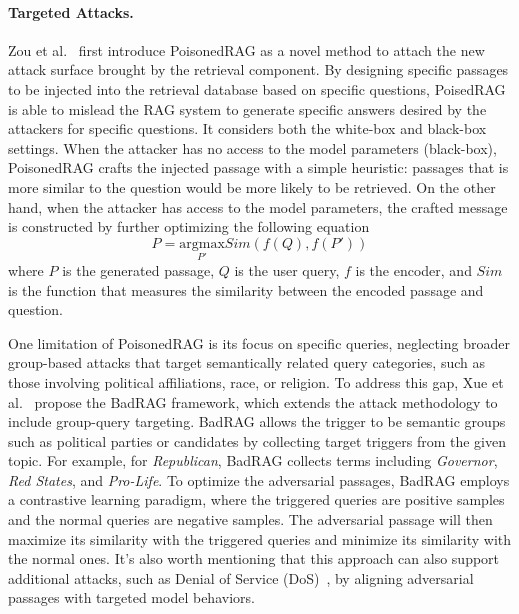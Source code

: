 \paragraph{Targeted Attacks.} 
Zou et al.~\cite{zou2024poisonedragknowledgecorruptionattacks} first introduce PoisonedRAG as a novel method to attach the new attack surface brought by the retrieval component. By designing specific passages to be injected into the retrieval database based on specific questions, PoisedRAG is able to mislead the RAG system to generate specific answers desired by the attackers for specific questions. It considers both the white-box and black-box settings. When the attacker has no access to the model parameters (black-box), PoisonedRAG crafts the injected passage with a simple heuristic: passages that is more similar to the question would be more likely to be retrieved. On the other hand, when the attacker has access to the model parameters, the crafted message is constructed by further optimizing the following equation 
\begin{equation}
    P = \underset{P'}{\text{argmax}}Sim(f(Q), f(P'))
\end{equation}
where $P$ is the generated passage, $Q$ is the user query, $f$ is the encoder, and $Sim$ is the function that measures the similarity between the encoded passage and question.

One limitation of PoisonedRAG is its focus on specific queries, neglecting broader group-based attacks that target semantically related query categories, such as those involving political affiliations, race, or religion. To address this gap, Xue et al.~\cite{xue2024badrag} propose the BadRAG framework, which extends the attack methodology to include group-query targeting. BadRAG allows the trigger to be semantic groups such as political parties or candidates by collecting target triggers from the given topic. For example, for \textit{Republican}, BadRAG collects terms including \textit{Governor}, \textit{Red States}, and \textit{Pro-Life}. To optimize the adversarial passages, BadRAG employs a contrastive learning paradigm, where the triggered queries are positive samples and the normal queries are negative samples. The adversarial passage will then maximize its similarity with the triggered queries and minimize its similarity with the normal ones. It's also worth mentioning that this approach can also support additional attacks, such as Denial of Service (DoS)~\cite{xue2024badrag}, by aligning adversarial passages with targeted model behaviors.

